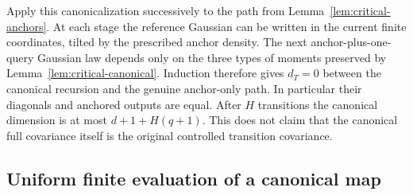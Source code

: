 \documentclass[11pt]{article}
\theoremstyle{remark}
\begin{document}
Apply this canonicalization successively to the path from
Lemma~\ref{lem:critical-anchors}. At each stage the reference
Gaussian can be written in the current finite coordinates, tilted
by the prescribed anchor density. The next anchor-plus-one-query
Gaussian law depends only on the three types of moments preserved
by Lemma~\ref{lem:critical-canonical}. Induction therefore gives
$d_T=0$ between the canonical recursion and the genuine anchor-only
path. In particular their diagonals and anchored outputs are equal.
After $H$ transitions the canonical dimension is at most
$d+1+H(q+1)$. This does not claim that the canonical full covariance
itself is the original controlled transition covariance.

\subsection{Uniform finite evaluation of a canonical map}
\end{document}
